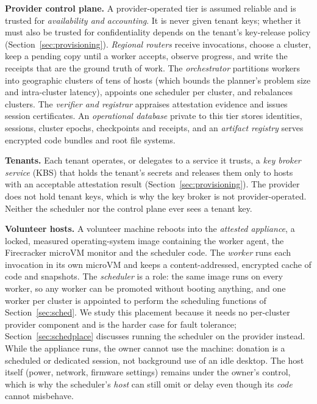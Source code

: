 \textbf{Provider control plane.} A provider-operated tier is assumed reliable and is trusted for \emph{availability and
accounting}. It is never given tenant keys; whether it must also be trusted for confidentiality depends on the tenant's key-release policy (Section~\ref{sec:provisioning}). \emph{Regional routers} receive invocations, choose a cluster, keep a pending
copy until a worker accepts, observe progress, and write the receipts that are the ground truth of work. The
\emph{orchestrator} partitions workers into geographic clusters of tens of hosts (which bounds the planner's problem size and
intra-cluster latency), appoints one scheduler per cluster, and rebalances clusters. The \emph{verifier and registrar} appraises
attestation evidence and issues session certificates. An \emph{operational database} private to this tier stores identities,
sessions, cluster epochs, checkpoints and receipts, and an \emph{artifact registry} serves encrypted code bundles and root
file systems.

\textbf{Tenants.} Each tenant operates, or delegates to a service it trusts, a \emph{key broker service} (KBS) that holds the tenant's secrets and releases them only to hosts with an
acceptable attestation result (Section~\ref{sec:provisioning}). The provider does not hold tenant keys, which is why the key broker is not provider-operated. Neither the scheduler nor the control plane ever sees a tenant key.

\textbf{Volunteer hosts.} A volunteer machine reboots into the \emph{attested appliance}, a locked, measured operating-system
image containing the worker agent, the Firecracker microVM monitor \cite{agache2020firecracker} and the scheduler code. The
\emph{worker} runs each invocation in its own microVM and keeps a content-addressed, encrypted cache of code and snapshots. The
\emph{scheduler} is a role: the same image runs on every worker, so any worker can be promoted without booting anything, and one
worker per cluster is appointed to perform the scheduling functions of Section~\ref{sec:sched}. We study this placement because it needs no per-cluster provider component and is the harder case for fault tolerance; Section~\ref{sec:schedplace} discusses running the scheduler on the provider instead. While the appliance runs, the owner cannot use the machine: donation is a scheduled or dedicated session, not background use of an idle desktop. The host itself (power, network,
firmware settings) remains under the owner's control, which is why the scheduler's \emph{host} can still omit or delay even though
its \emph{code} cannot misbehave.

